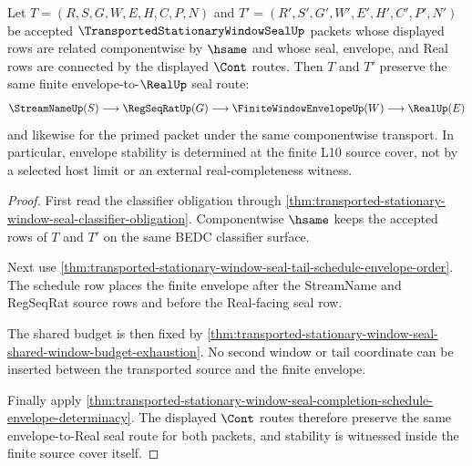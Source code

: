 \begin{theorem}
\label{thm:transported-stationary-window-seal-root-l10-envelope-stability}
Let $T=(R,S,G,W,E,H,C,P,N)$ and $T'=(R',S',G',W',E',H',C',P',N')$ be accepted $\TransportedStationaryWindowSealUp$ packets whose displayed rows are related componentwise by $\hsame$ and whose seal, envelope, and Real rows are connected by the displayed $\Cont$ routes. Then $T$ and $T'$ preserve the same finite envelope-to-$\RealUp$ seal route:
$$
\begin{aligned}
  \StreamNameUp(S)
  \longrightarrow
  \RegSeqRatUp(G)
  \longrightarrow
  \FiniteWindowEnvelopeUp(W)
  \longrightarrow
  \RealUp(E)
\end{aligned}
$$
and likewise for the primed packet under the same componentwise transport. In particular, envelope stability is determined at the finite L10 source cover, not by a selected host limit or an external real-completeness witness.
\end{theorem}
\begin{proof}
First read the classifier obligation through \autoref{thm:transported-stationary-window-seal-classifier-obligation}. Componentwise $\hsame$ keeps the accepted rows of $T$ and $T'$ on the same BEDC classifier surface.

Next use \autoref{thm:transported-stationary-window-seal-tail-schedule-envelope-order}. The schedule row places the finite envelope after the StreamName and RegSeqRat source rows and before the Real-facing seal row.

The shared budget is then fixed by \autoref{thm:transported-stationary-window-seal-shared-window-budget-exhaustion}. No second window or tail coordinate can be inserted between the transported source and the finite envelope.

Finally apply \autoref{thm:transported-stationary-window-seal-completion-schedule-envelope-determinacy}. The displayed $\Cont$ routes therefore preserve the same envelope-to-Real seal route for both packets, and stability is witnessed inside the finite source cover itself.
\end{proof}


